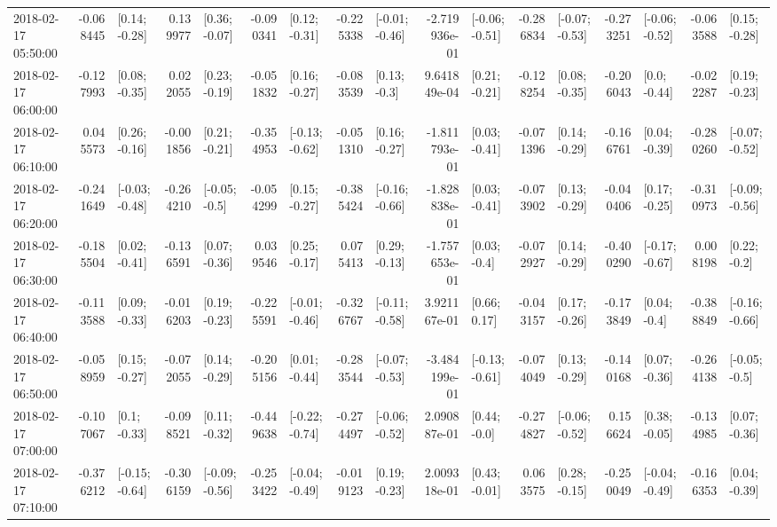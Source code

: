 \begin{tabular}{lrlrlrlrlrlrlrlrl}
2018-02-17 05:50:00 & -0.068445 &   [0.14; -0.28] &  0.139977 &   [0.36; -0.07] & -0.090341 &   [0.12; -0.31] & -0.225338 &  [-0.01; -0.46] & -2.719936e-01 &  [-0.06; -0.51] & -0.286834 &  [-0.07; -0.53] & -0.273251 &  [-0.06; -0.52] & -0.063588 &   [0.15; -0.28] \\
2018-02-17 06:00:00 & -0.127993 &   [0.08; -0.35] &  0.022055 &   [0.23; -0.19] & -0.051832 &   [0.16; -0.27] & -0.083539 &    [0.13; -0.3] &  9.641849e-04 &   [0.21; -0.21] & -0.128254 &   [0.08; -0.35] & -0.206043 &    [0.0; -0.44] & -0.022287 &   [0.19; -0.23] \\
2018-02-17 06:10:00 &  0.045573 &   [0.26; -0.16] & -0.001856 &   [0.21; -0.21] & -0.354953 &  [-0.13; -0.62] & -0.051310 &   [0.16; -0.27] & -1.811793e-01 &   [0.03; -0.41] & -0.071396 &   [0.14; -0.29] & -0.166761 &   [0.04; -0.39] & -0.280260 &  [-0.07; -0.52] \\
2018-02-17 06:20:00 & -0.241649 &  [-0.03; -0.48] & -0.264210 &   [-0.05; -0.5] & -0.054299 &   [0.15; -0.27] & -0.385424 &  [-0.16; -0.66] & -1.828838e-01 &   [0.03; -0.41] & -0.073902 &   [0.13; -0.29] & -0.040406 &   [0.17; -0.25] & -0.310973 &  [-0.09; -0.56] \\
2018-02-17 06:30:00 & -0.185504 &   [0.02; -0.41] & -0.136591 &   [0.07; -0.36] &  0.039546 &   [0.25; -0.17] &  0.075413 &   [0.29; -0.13] & -1.757653e-01 &    [0.03; -0.4] & -0.072927 &   [0.14; -0.29] & -0.400290 &  [-0.17; -0.67] &  0.008198 &    [0.22; -0.2] \\
2018-02-17 06:40:00 & -0.113588 &   [0.09; -0.33] & -0.016203 &   [0.19; -0.23] & -0.225591 &  [-0.01; -0.46] & -0.326767 &  [-0.11; -0.58] &  3.921167e-01 &    [0.66; 0.17] & -0.043157 &   [0.17; -0.26] & -0.173849 &    [0.04; -0.4] & -0.388849 &  [-0.16; -0.66] \\
2018-02-17 06:50:00 & -0.058959 &   [0.15; -0.27] & -0.072055 &   [0.14; -0.29] & -0.205156 &   [0.01; -0.44] & -0.283544 &  [-0.07; -0.53] & -3.484199e-01 &  [-0.13; -0.61] & -0.074049 &   [0.13; -0.29] & -0.140168 &   [0.07; -0.36] & -0.264138 &   [-0.05; -0.5] \\
2018-02-17 07:00:00 & -0.107067 &    [0.1; -0.33] & -0.098521 &   [0.11; -0.32] & -0.449638 &  [-0.22; -0.74] & -0.274497 &  [-0.06; -0.52] &  2.090887e-01 &    [0.44; -0.0] & -0.274827 &  [-0.06; -0.52] &  0.156624 &   [0.38; -0.05] & -0.134985 &   [0.07; -0.36] \\
2018-02-17 07:10:00 & -0.376212 &  [-0.15; -0.64] & -0.306159 &  [-0.09; -0.56] & -0.253422 &  [-0.04; -0.49] & -0.019123 &   [0.19; -0.23] &  2.009318e-01 &   [0.43; -0.01] &  0.063575 &   [0.28; -0.15] & -0.250049 &  [-0.04; -0.49] & -0.166353 &   [0.04; -0.39] \\

\end{tabular}
